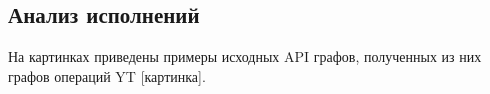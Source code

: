 \subsection{Анализ исполнений}

На картинках приведены примеры исходных API графов, полученных из них графов операций YT [картинка].
